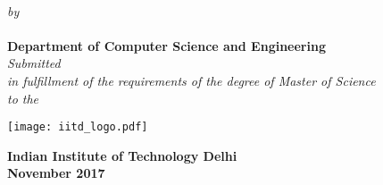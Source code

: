 \begin{titlepage}
\begin{center}
\Large{\textsf{\bfseries \ThesisTitle}}\\
\vspace{40pt}
\normalsize \emph {by}\\
\vspace{40pt}
\large{\textsf{\bfseries \Auth}} \\
\vspace{15pt}
\large{\textsf{\bf Department of Computer Science and Engineering}}\\
\vspace{60pt}
{\normalsize \emph {Submitted}}\\
\vspace{25pt}
{\normalsize \emph {in fulfillment of the requirements of the degree of Master of Science}}\\
\vspace{25pt}
{\normalsize \emph {to the}}
\ \\
\vspace{20pt}
\begin{center}
\texttt{[image: iitd\_logo.pdf]} \\
\vspace{10pt}
\end{center}

\large{\textsf{\bf Indian Institute of Technology Delhi\\}}
\vspace{10pt}
\large{\textsf{\bf November 2017}}
\end{center}
\end{titlepage}

